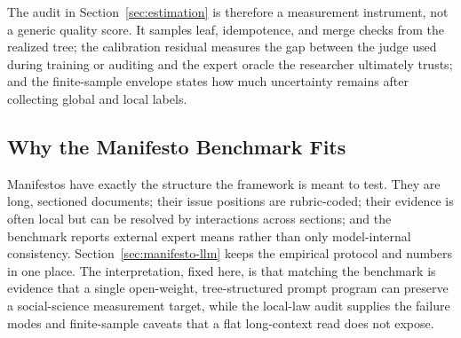 The audit in Section~\ref{sec:estimation} is therefore a measurement
instrument, not a generic quality score. It samples leaf, idempotence, and
merge checks from the realized tree; the calibration residual measures the
gap between the judge used during training or auditing and the expert
oracle the researcher ultimately trusts; and the finite-sample envelope
states how much uncertainty remains after collecting global and local
labels.

\subsection{Why the Manifesto Benchmark Fits}

Manifestos have exactly the structure the framework is meant to test.
They are long, sectioned documents; their issue positions are rubric-coded;
their evidence is often local but can be resolved by interactions across
sections; and the benchmark reports external expert means rather than only
model-internal consistency. Section~\ref{sec:manifesto-llm} keeps the
empirical protocol and numbers in one place. The interpretation, fixed
here, is that matching the benchmark is evidence that a single
open-weight, tree-structured prompt program can preserve a
social-science measurement target, while the local-law audit supplies
the failure modes and finite-sample caveats that a flat long-context
read does not expose.
